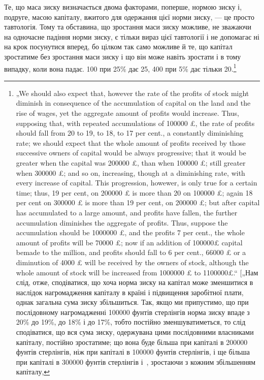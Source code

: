 Те, що маса зиску визначається двома факторами, поперше,
нормою зиску і, подруге, масою капіталу, вжитого для одержання
цієї норми зиску, — це просто тавтологія. Тому та обставина,
що зростання маси зиску можливе, не зважаючи на одночасне
падіння норми зиску, є тільки вираз цієї тавтології і
не допомагає ні на крок посунутися вперед, бо цілком так само
можливе й те, що капітал зростатиме без зростання маси зиску
і що він може навіть зростати і в тому випадку, коли вона
падає. 100 при 25\% дає 25, 400 при 5\% дає тільки 20.\footnote{
„We should also expect that, however the rate of the profits of stock
might diminish in consequence of the accumulation of capital on the land and the
rise of wages, yet the aggregate amount of profits would increase. Thus, supposing
that, with repeated accumulations of 100000 £, the rate of profits should fall from
20 to 19, to 18, to 17 per cent., a constantly diminishing rate; we should expect that
the whole amount of profits received by those successive owners of capital would be
always progressive; that it would be greater when the capital was 200000 £, than
when 100000 £; still greater when 300000  £; and so on, increasing, though at a
diminishing rate, with every increase of capital. This progression, howewer, is only
true for a certain time; thus, 19 per cent, on 200000 £ is more than 20 on 100000 £;
again 18 per cent on 300000 £ is more than 19 per cent, on 200000 £; but after
capital has accumulated to a large amount, and profits have fallen, the further
accumulation diminishes the aggregate of profits. Thus, suppose the accumulation
should be 1000000 £, and the profits 7 per cent., the whole amount of profits will be
70000 £; now if an addition of 100000£ capital bemade to the million, and profits should
fall to 6 per cent., 66000 £ or a diminution of 4000 £ will be received by the owners
of stock, although the whole amount of stock will be increased from 1000000 £ to
1100000£.“ [„Нам слід, отже, сподіватися, що хоча норма зиску на капітал може
зменшитися в наслідок нагромадження капіталу в країні і підвищення заробітної
плати, однак загальна сума зиску збільшиться. Так, якщо ми припустимо, що при
послідовному нагромадженні 100000 фунтів стерлінгів норма зиску впаде з 20\% до
19\%, до 18\% і до 17\%, тобто постійно зменшуватиметься, то слід сподіватися,
що вся сума зиску, одержувана цими послідовними власниками капіталу, постійно
зростатиме; що вона буде більша при капіталі в 200000 фунтів стерлінгів,
ніж при капіталі в 100000 фунтів стерлінгів, і ще більша при капіталі
в 300000 фунтів стерлінгів і~, зростаючи з кожним збільшенням капіталу,
}
